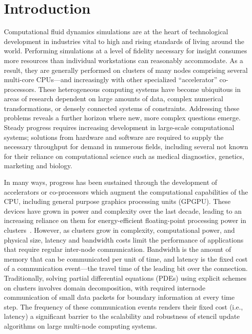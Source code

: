 \section{Introduction}

Computational fluid dynamics simulations are at the heart of technological development in industries vital to high and rising standards of living around the world.
Performing simulations at a level of fidelity necessary for insight consumes more resources
than individual workstations can reasonably accommodate.
As a result, they are generally performed on clusters of many nodes comprising several
multi-core CPUs---and increasingly with other specialized ``accelerator'' co-processors.
These heterogeneous computing systems have become ubiquitous in areas of research dependent
on large amounts of data, complex numerical transformations, or densely connected systems of
constraints.
Addressing these problems reveals a further horizon where new, more complex questions emerge.
Steady progress requires increasing development in large-scale computational systems; solutions from hardware and software are required to supply the necessary throughput for demand in numerous fields, including several not known for their reliance on computational science such as medical diagnostics, genetics, marketing and biology.

In many ways, progress has been sustained through the development of accelerators or co-processors which augment the computational capabilities of the CPU, including general purpose graphics processing units (GPGPU).
These devices have grown in power and complexity over the last decade, leading to an increasing
reliance on them for energy-efficient floating-point processing power in clusters~\cite{ALEXANDROV20161}.
However, as clusters grow in complexity, computational power, and physical size, latency and bandwidth
costs limit the performance of applications that require regular inter-node communication.
Bandwidth is the amount of memory that can be communicated per unit of time, and latency is the
fixed cost of a communication event---the travel time of the leading bit over the connection.
Traditionally, solving partial differential equations (PDEs) using explicit schemes on
clusters involves domain decomposition, with required internode communication of small
data packets for boundary information at every time step.
The frequency of these communication events renders their fixed cost (i.e., latency) a
significant barrier to the scalability and robustness of stencil update algorithms on
large multi-node computing systems.

